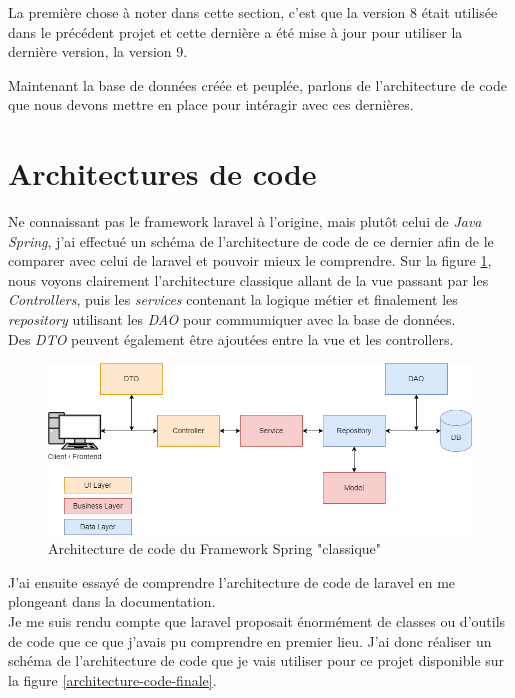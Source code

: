 \documentclass[
    iai, %
    il, %
]{heig-tb}
\begin{document}
La première chose à noter dans cette section, c'est que la version 8 était utilisée dans le précédent projet et cette dernière a été mise à jour pour utiliser la dernière version, la version 9.

Maintenant la base de données créée et peuplée, parlons de l'architecture de code que nous devons mettre en place pour intéragir avec ces dernières.

\section{Architectures de code}

Ne connaissant pas le \Gls{framework} \Gls{laravel} à l'origine, mais plutôt celui de \emph{Java Spring}, j'ai effectué un schéma de l'architecture de code de ce dernier afin de le comparer avec celui de \Gls{laravel} et pouvoir mieux le comprendre. Sur la figure \ref{architecture-code-spring}, nous voyons clairement l'architecture classique allant de la vue passant par les \emph{Controllers}, puis les \emph{services} contenant la logique métier et finalement les \emph{repository} utilisant les \emph{DAO} pour commumiquer avec la base de données. \\
Des \emph{DTO} peuvent également être ajoutées entre la vue et les controllers.

\begin{center}
    \begin{figure}
        \includegraphics[width=\textwidth]{./assets/figures/architecture-code-spring.drawio.png}
        \caption{Architecture de code du Framework Spring "classique" \label{architecture-code-spring}}
    \end{figure}
\end{center}

J'ai ensuite essayé de comprendre l'architecture de code de \Gls{laravel} en me plongeant dans la documentation. \\
Je me suis rendu compte que \Gls{laravel} proposait énormément de classes ou d'outils de code que ce que j'avais pu comprendre en premier lieu. J'ai donc réaliser un schéma de l'architecture de code que je vais utiliser pour ce projet disponible sur la figure \ref{architecture-code-finale}.
\end{document}
